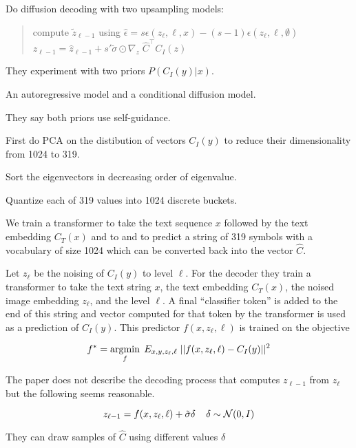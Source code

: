 {\vfill
Do diffusion decoding with two upsampling models:

\vfill
\begin{quotation}
compute $\tilde{z}_{\ell-1}$ using $\hat{\epsilon} = s\epsilon(z_\ell,\ell,x) - (s-1)\epsilon(z_\ell,\ell,\emptyset)$
\vfill
$z_{\ell-1} = \hat{z}_{\ell-1} + s'\tilde{\sigma}\odot\nabla_z\;\hat{C}^\top C_I(z)$
\end{quotation}


They experiment with two priors $P(C_I(y)|x)$.

\vfill
An autoregressive model and a conditional diffusion model.

\vfill
They say both priors use self-guidance.


First do PCA on the distibution of vectors $C_I(y)$ to reduce their dimensionality from 1024 to 319.

\vfill
Sort the eigenvectors in decreasing order of eigenvalue.

\vfill
Quantize each of 319 values into 1024 discrete buckets.

\vfill
We train a transformer to take the text sequence $x$ followed by the text embedding $C_T(x)$ and to
and to predict a string of 319 symbols with a vocabulary of size 1024 which can be converted back into the vector $\hat{C}$.


Let $z_\ell$ be the noising of $C_I(y)$ to level $\ell$.  For the decoder they train a transformer to take the text string $x$, the text embedding $C_T(x)$, the noised
image embedding $z_\ell$, and the level $\ell$. A final ``classifier token'' is added to the end of this string and vector computed for that token by the transformer is used as a prediction of $C_I(y)$.
This predictor $f(x,z_\ell,\ell)$ is trained on the objective

$$f^* = \operatorname*{argmin}_f\;E_{x,y,z_\ell,\ell}\; ||f(x,z_\ell,\ell) - C_I(y)||^2$$


The paper does not describe the decoding process that computes $z_{\ell-1}$ from $z_\ell$ but the following seems reasonable.

$$z_{\ell-1} = f(x,z_\ell,\ell) +\tilde{\sigma}\delta\;\;\;\;\delta \sim {\cal N}(0,I)$$

\vfill
They can draw samples of $\hat{C}$ using different values $\delta$

}
